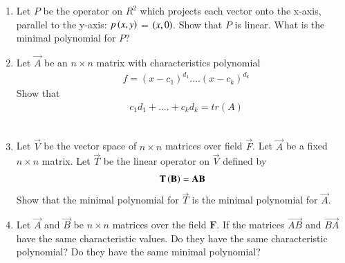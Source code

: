 \begin{enumerate}[label=\thesubsection.\arabic*.,ref=\thesubsection.\theenumi]
%
\item Let $P$ be the operator on $R^2$ which projects each vector onto the x-axis, parallel to the y-axis: $p\left(x,y\right)$ = $\left(x,0\right)$. Show that $P$ is linear. What is the minimal polynomial for $P$? 
%
\\
\solution

\twocolumn
\item %
Let $\vec{A}$ be an $n\times n$ matrix with characteristics polynomial\\
\begin{align}
& f = (x-c_1)^{d_1}....(x-c_k)^{d_k} 
\end{align}
Show that
\begin{align}
& c_1d_1+....+c_kd_k = tr(A)
\end{align}
%
%
\\
\solution

\twocolumn
\item Let $\vec{V}$ be the vector space of $n\times n$ matrices over field $\vec{F}$. Let $\vec{A}$ be a fixed $n\times n$ matrix. Let $\vec{T}$ be the linear operator on $\vec{V}$ defined by
\begin{align}
    \mathbf{T\left(B\right)}=\mathbf{AB}
\end{align}
Show that the minimal polynomial for $\vec{T}$ is the minimal polynomial for $\vec{A}$.
%
%
\twocolumn
\item 	Let $\vec{A}$ and $\vec{B}$ be $n\times n$ matrices over the field $\mathbf{F}$. If the matrices $\vec{AB}$ and $\vec{BA}$ have the same characteristic values. Do they have the same characteristic polynomial? Do they have the same minimal polynomial? 
%
\\
\solution

\end{enumerate}
